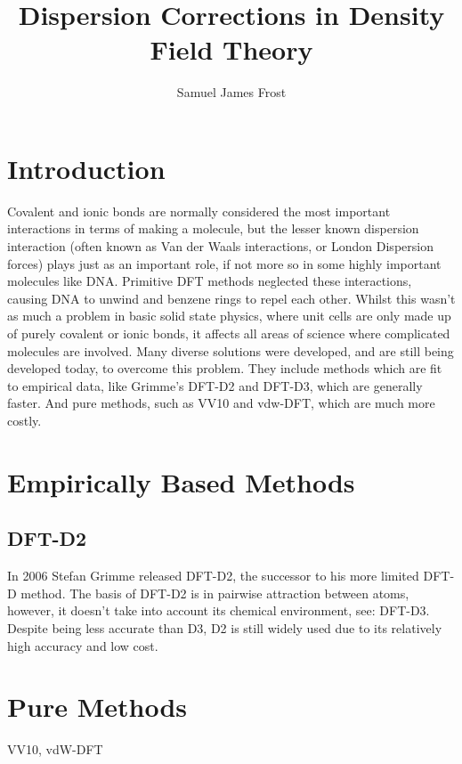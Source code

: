 \documentclass[10pt,a4paper,twocolumn,twoside]{extarticle}
\title{Dispersion Corrections in Density Field Theory}
\author{Samuel James Frost}
\begin{document}
	\thispagestyle{empty}
	\twocolumn[
	\begin{@twocolumnfalse}
		\begin{center}
			\vspace*{-10mm}
			{\Large\scshape\papertitle}\\
			\vspace{2ex}
			{\itshape\paperauthor}
		\end{center}
		\centering\noindent\rule{0.9\textwidth}{0.4pt}
		\begin{abstract}
			{\lipsum[5]}
		\end{abstract}
		\centering\noindent\rule{0.9\textwidth}{0.4pt}\\
		\vspace{1cm}
	\end{@twocolumnfalse}]
	\tableofcontents

	
	\section{Introduction}
	Covalent and ionic bonds are normally considered the most important interactions in terms of making a molecule, but the lesser known dispersion interaction (often known as Van der Waals interactions, or London Dispersion forces) plays just as an important role, if not more so in some highly important molecules like DNA.
	Primitive DFT methods neglected these interactions, causing DNA to unwind and benzene rings to repel each other. Whilst this wasn't as much a problem in basic solid state physics, where unit cells are only made up of purely covalent or ionic bonds, it affects all areas of science where complicated molecules are involved. 
	Many diverse solutions were developed, and are still being developed today, to overcome this problem. They include methods which are fit to empirical data, like Grimme's DFT-D2 and DFT-D3, which are generally faster. And pure methods, such as VV10 and vdw-DFT, which are much more costly.


	\section{Empirically Based Methods}
	\subsection{DFT-D2}
	In 2006 Stefan Grimme released DFT-D2\cite{Grimme2006}, 
	the successor to his more limited DFT-D method.
	The basis of DFT-D2 is in pairwise attraction between atoms, however, it doesn't take into account its chemical environment, see: DFT-D3. Despite being less accurate than D3, D2 is still widely used due to its relatively high accuracy and low cost.


	\section{Pure Methods}
	VV10, vdW-DFT

	\lipsum[2-5]

	\newpage
	\printbibliography
\end{document}
